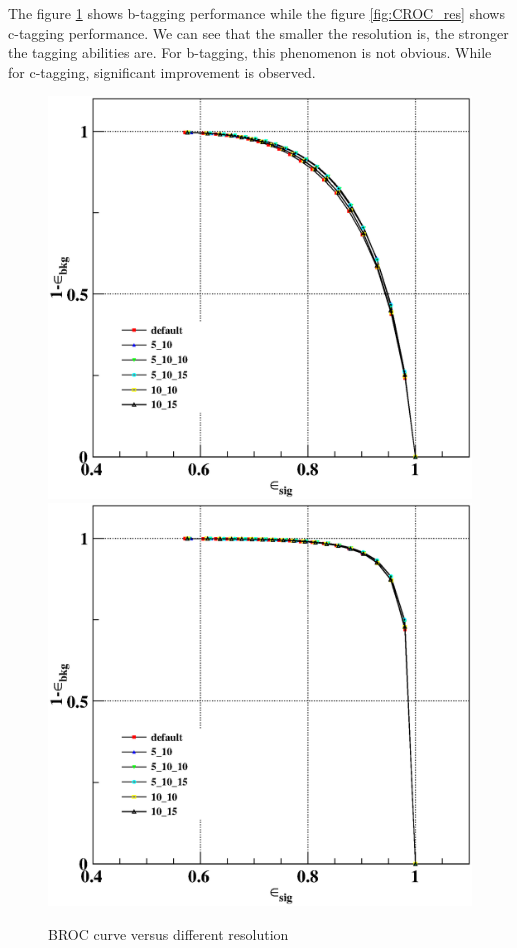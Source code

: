 \documentclass[usetikz]{style/cepcnote}
\begin{document}
The figure \ref{fig:BROC_res} shows b-tagging performance while the figure \ref{fig:CROC_res} shows c-tagging performance. We can see that the smaller the resolution is, the stronger the tagging abilities are. For b-tagging, this phenomenon is not obvious. While for c-tagging, significant improvement is observed.
\begin{figure}[!ht]
	\centering
	\includegraphics[scale=0.35]{figures/resolution/plot6ROC-cbkg-bjet.eps}
	\includegraphics[scale=0.35]{figures/resolution/plot6ROC-obkg-bjet.eps}
	\caption{BROC curve versus different resolution}
	\label{fig:BROC_res}
\end{figure}
\end{document}
